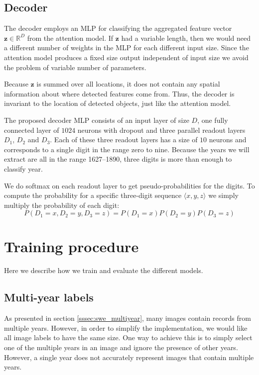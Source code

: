 

\subsection{Decoder}

The decoder employs an MLP for classifying the aggregated feature vector $\mathbf{z} \in \mathbb{R}^D$ from the attention model.
If $\mathbf{z}$ had a variable length, then we would need a different number of weights in the MLP for each different input size. Since the attention model produces a fixed size output independent of input size we avoid the problem of variable number of parameters.

Because $\mathbf{z}$ is summed over all locations, it does not contain any spatial information about where detected features come from.
Thus, the decoder is invariant to the location of detected objects, just like the attention model.

The proposed decoder MLP consists of an input layer of size $D$, one fully connected layer of $1024$ neurons with dropout and three parallel readout layers $D_1$, $D_2$ and $D_3$. Each of these three readout layers has a size of $10$ neurons and corresponds to a single digit in the range zero to nine.
Because the years we will extract are all in the range 1627--1890, three digits is more than enough to classify year.

We do softmax on each readout layer to get pseudo-probabilities for the digits.
To compute the probability for a specific three-digit sequence $\langle x, y, z \rangle$ we simply multiply the probability of each digit:
\[
P(D_1=x, D_2=y, D_3=z) = P(D_1=x) P(D_2=y) P(D_3=z)
\]


\section{Training procedure}

Here we describe how we train and evaluate the different models.

\subsection{Multi-year labels}

As presented in section \ref{sssec:swe_multiyear}, many images contain records from multiple years. However, in order to simplify the implementation, we would like all image labels to have the same size.
One way to achieve this is to simply select one of the multiple years in an image and ignore the presence of other years. However, a single year does not accurately represent images that contain multiple years.

